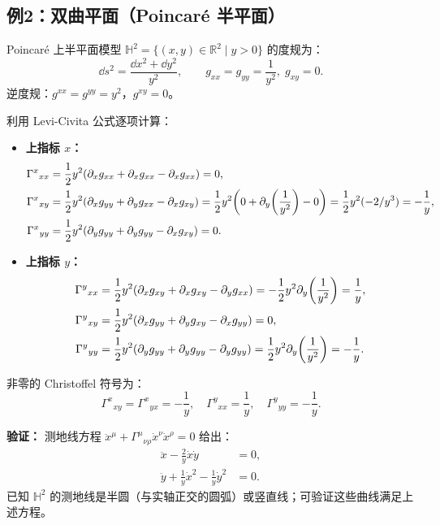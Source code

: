 \subsection{例2：双曲平面（Poincaré 半平面）}

Poincaré 上半平面模型 $\mathbb{H}^2 = \{(x,y) \in \mathbb{R}^2 \mid y > 0\}$ 的度规为：
\begin{equation}
    \dd s^2 = \frac{\dd x^2 + \dd y^2}{y^2}, \qquad 
    g_{xx} = g_{yy} = \frac{1}{y^2},\; g_{xy} = 0.
\end{equation}
逆度规：$g^{xx} = g^{yy} = y^2$，$g^{xy} = 0$。

利用 Levi-Civita 公式逐项计算：
\begin{itemize}
    \item \textbf{上指标 $x$：}
    \begin{align}
        \Gamma^x{}_{xx} &= \frac12 y^2(\partial_x g_{xx} + \partial_x g_{xx} - \partial_x g_{xx}) = 0, \\
        \Gamma^x{}_{xy} &= \frac12 y^2(\partial_x g_{yy} + \partial_y g_{xx} - \partial_x g_{xy}) 
                          = \frac12 y^2\!\left(0 + \partial_y\!\left(\frac{1}{y^2}\right) - 0\right) 
                          = \frac12 y^2(-2/y^3) = -\frac{1}{y}, \\
        \Gamma^x{}_{yy} &= \frac12 y^2(\partial_y g_{yy} + \partial_y g_{yy} - \partial_x g_{xy}) = 0.
    \end{align}
    \item \textbf{上指标 $y$：}
    \begin{align}
        \Gamma^y{}_{xx} &= \frac12 y^2(\partial_x g_{xy} + \partial_x g_{xy} - \partial_y g_{xx}) 
                          = -\frac12 y^2 \partial_y\!\left(\frac{1}{y^2}\right) 
                          = \frac{1}{y}, \\
        \Gamma^y{}_{xy} &= \frac12 y^2(\partial_x g_{yy} + \partial_y g_{xy} - \partial_x g_{yy}) = 0, \\
        \Gamma^y{}_{yy} &= \frac12 y^2(\partial_y g_{yy} + \partial_y g_{yy} - \partial_y g_{yy}) 
                          = \frac12 y^2 \partial_y\!\left(\frac{1}{y^2}\right) = -\frac{1}{y}.
    \end{align}
\end{itemize}

非零的 Christoffel 符号为：
\begin{equation}
    \boxed{\Gamma^x{}_{xy} = \Gamma^x{}_{yx} = -\frac{1}{y}, \quad
           \Gamma^y{}_{xx} = \frac{1}{y}, \quad
           \Gamma^y{}_{yy} = -\frac{1}{y}}.
\end{equation}

\textbf{验证：} 测地线方程 $\ddot{x}^\mu + \Gamma^\mu{}_{\nu\rho}\dot{x}^\nu\dot{x}^\rho = 0$ 给出：
\begin{align}
    \ddot{x} - \frac{2}{y}\dot{x}\dot{y} &= 0, \\
    \ddot{y} + \frac{1}{y}\dot{x}^2 - \frac{1}{y}\dot{y}^2 &= 0.
\end{align}
已知 $\mathbb{H}^2$ 的测地线是半圆（与实轴正交的圆弧）或竖直线；可验证这些曲线满足上述方程。

